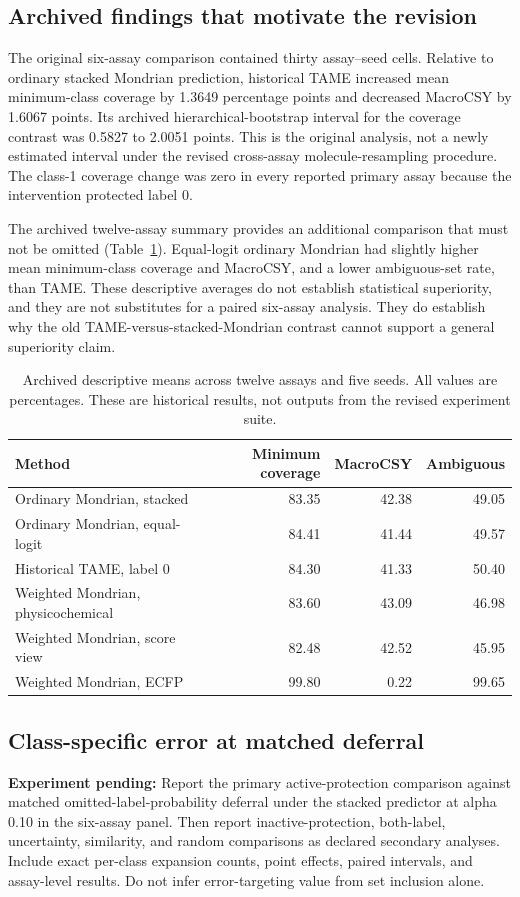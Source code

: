 \documentclass[11pt]{article}
\newcommand{\pending}[1]{\par\noindent\textbf{Experiment pending:} #1\par}
\begin{document}
\subsection{Archived findings that motivate the revision}
The original six-assay comparison contained thirty assay--seed cells. Relative to ordinary stacked Mondrian prediction, historical TAME increased mean minimum-class coverage by 1.3649 percentage points and decreased MacroCSY by 1.6067 points. Its archived hierarchical-bootstrap interval for the coverage contrast was 0.5827 to 2.0051 points. This is the original analysis, not a newly estimated interval under the revised cross-assay molecule-resampling procedure. The class-1 coverage change was zero in every reported primary assay because the intervention protected label 0.

The archived twelve-assay summary provides an additional comparison that must not be omitted (Table~\ref{tab:historical}). Equal-logit ordinary Mondrian had slightly higher mean minimum-class coverage and MacroCSY, and a lower ambiguous-set rate, than TAME. These descriptive averages do not establish statistical superiority, and they are not substitutes for a paired six-assay analysis. They do establish why the old TAME-versus-stacked-Mondrian contrast cannot support a general superiority claim.

\begin{table}[htbp]
\centering
\caption{Archived descriptive means across twelve assays and five seeds. All values are percentages. These are historical results, not outputs from the revised experiment suite.}
\label{tab:historical}
\small
\begin{tabular}{p{}rrr}
\toprule
Method & Minimum coverage & MacroCSY & Ambiguous\\
\midrule
Ordinary Mondrian, stacked & 83.35 & 42.38 & 49.05\\
Ordinary Mondrian, equal-logit & 84.41 & 41.44 & 49.57\\
Historical TAME, label 0 & 84.30 & 41.33 & 50.40\\
Weighted Mondrian, physicochemical & 83.60 & 43.09 & 46.98\\
Weighted Mondrian, score view & 82.48 & 42.52 & 45.95\\
Weighted Mondrian, ECFP & 99.80 & 0.22 & 99.65\\
\bottomrule
\end{tabular}
\end{table}

\subsection{Class-specific error at matched deferral}
\pending{Report the primary active-protection comparison against matched omitted-label-probability deferral under the stacked predictor at alpha 0.10 in the six-assay panel. Then report inactive-protection, both-label, uncertainty, similarity, and random comparisons as declared secondary analyses. Include exact per-class expansion counts, point effects, paired intervals, and assay-level results. Do not infer error-targeting value from set inclusion alone.}
\end{document}

